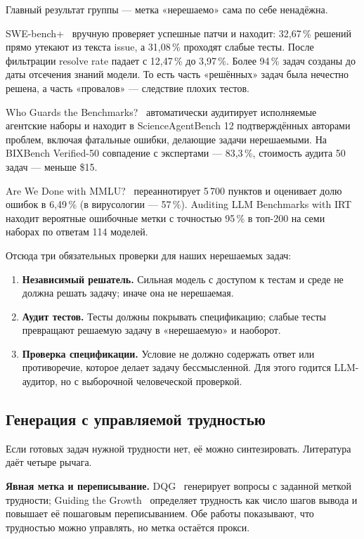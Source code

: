 \documentclass[11pt,a4paper]{article}
\begin{document}
Главный результат группы — метка «нерешаемо» сама по себе ненадёжна.

SWE-bench+~\cite{swebenchplus2024} вручную проверяет успешные патчи и
находит: 32{,}67\,\% решений прямо утекают из текста issue, а 31{,}08\,\%
проходят слабые тесты. После фильтрации resolve rate падает с 12{,}47\,\%
до 3{,}97\,\%. Более 94\,\% задач созданы до даты отсечения знаний модели.
То есть часть «решённых» задач была нечестно решена, а часть «провалов» —
следствие плохих тестов.

Who Guards the Benchmarks?~\cite{whoguards2026} автоматически аудитирует
исполняемые агентские наборы и находит в ScienceAgentBench 12
подтверждённых авторами проблем, включая фатальные ошибки, делающие задачи
нерешаемыми. На BIXBench Verified-50 совпадение с экспертами — 83{,}3\,\%,
стоимость аудита 50 задач — меньше \$15.

Are We Done with MMLU?~\cite{mmlu_redux2024} переаннотирует 5\,700 пунктов
и оценивает долю ошибок в 6{,}49\,\% (в вирусологии — 57\,\%). Auditing LLM
Benchmarks with IRT~\cite{audit_irt2026} находит вероятные ошибочные метки с
точностью 95\,\% в топ-200 на семи наборах по ответам 114 моделей.

Отсюда три обязательных проверки для наших нерешаемых задач:
\begin{enumerate}
  \item \textbf{Независимый решатель.} Сильная модель с доступом к тестам и
        среде не должна решать задачу; иначе она не нерешаемая.
  \item \textbf{Аудит тестов.} Тесты должны покрывать спецификацию; слабые
        тесты превращают решаемую задачу в «нерешаемую» и наоборот.
  \item \textbf{Проверка спецификации.} Условие не должно содержать ответ
        или противоречие, которое делает задачу бессмысленной. Для этого
        годится LLM-аудитор, но с выборочной человеческой проверкой.
\end{enumerate}

\subsection{Генерация с управляемой трудностью}

Если готовых задач нужной трудности нет, её можно синтезировать. Литература
даёт четыре рычага.

\textbf{Явная метка и переписывание.} DQG~\cite{dqg2018} генерирует вопросы
с заданной меткой трудности; Guiding the Growth~\cite{guiding_growth2021}
определяет трудность как число шагов вывода и повышает её пошаговым
переписыванием. Обе работы показывают, что трудностью можно управлять, но
метка остаётся прокси.
\end{document}
